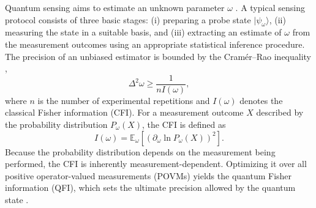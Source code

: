 \documentclass[amsmath,nobibnotes,aps,amssymb,pra, prl,aps,showpacs,superscriptaddress,twocolumn, longbibliography, reprint]{revtex4-2}
\begin{document}
Quantum sensing aims to estimate an unknown parameter $\omega$ \cite{helstrom1969quantum}. A typical sensing protocol consists of three basic stages: (i) preparing a probe state $|\psi_{\omega}\rangle$, (ii) measuring the state in a suitable basis, and (iii) extracting an estimate of $\omega$ from the measurement outcomes using an appropriate statistical inference procedure. The precision of an unbiased estimator is bounded by the Cram\'er--Rao inequality \cite{rao1992information, cramer1999mathematical},
\begin{equation}
    \Delta^2\omega \geq \frac{1}{n I(\omega)},
\end{equation}
where $n$ is the number of experimental repetitions and $I(\omega)$ denotes the classical Fisher information (CFI). For a measurement outcome $X$ described by the probability distribution $P_{\omega}(X)$, the CFI is defined as
\begin{equation}
    I(\omega)
    = \mathbb{E}_{\omega}
    \left[
        \left(
            \partial_{\omega}\ln P_{\omega}(X)
        \right)^2
    \right].
\end{equation}
Because the probability distribution depends on the measurement being performed, the CFI is inherently measurement-dependent. Optimizing it over all positive operator-valued measurements (POVMs) yields the quantum Fisher information (QFI), which sets the ultimate precision allowed by the quantum state \cite{braunstein1994statistical, braunstein1996generalized}. 
\end{document}
